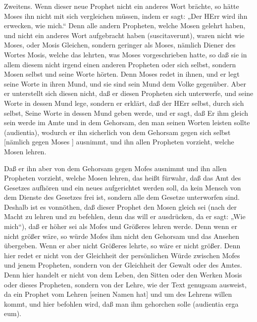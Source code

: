 Zweitens. Wenn dieser neue Prophet nicht ein anderes Wort brächte, so hätte Moses ihn nicht mit sich vergleichen müssen, indem er sagt: „Der HErr wird ihn erwecken, wie mich.“ Denn alle andern Propheten, welche Mosen gelehrt haben, und nicht ein anderes Wort aufgebracht haben (suscitaverunt), waren nicht wie Moses, oder Mosis Gleichen, sondern geringer als Moses, nämlich Diener des Wortes Mosis, welche das lehrten, was Moses vorgeschrieben hatte, so daß sie in allem diesem nicht irgend einen anderen Propheten oder sich selbst, sondern Mosen selbst und seine Worte hörten. Denn Moses redet in ihnen, und er legt seine Worte in ihren Mund, und sie sind sein Mund dem Volke gegenüber. Aber er unterstellt sich diesen nicht, daß er diesen Propheten sich unterwerfe, und seine Worte in dessen Mund lege, sondern er erklärt, daß der HErr selbst, durch sich selbst, Seine Worte in dessen Mund geben werde, und er sagt, daß Er ihm gleich sein werde im Amte und in dem Gehorsam, den man seinen Worten leisten sollte (audientia), wodurch er ihn sicherlich von dem Gehorsam gegen sich selbst [nämlich gegen Moses
] ausnimmt, und ihn allen Propheten vorzieht, welche Mosen lehren.

Daß er ihn aber von dem Gehorsam gegen Mofes ausnimmt und ihn allen Propheten vorzieht, welche Mosen lehren, das heißt fürwahr, daß das Amt des Gesetzes aufhören und ein neues aufgerichtet werden soll, da kein Mensch von dem Dienste des Gesetzes frei ist, sondern alle dem Gesetze unterworfen sind. Deshalb ist es vonnöthen, daß dieser Prophet den Mosen gleich sei (nach der Macht zu lehren und zu befehlen, denn das will er ausdrücken, da er sagt: „Wie mich“), daß er höher sei als Mofes und Größeres lehren werde. Denn wenn er nicht größer wäre, so würde Mofes ihm nicht den Gehorsam und das Ansehen übergeben. Wenn er aber nicht Größeres lehrte, so wäre er nicht größer. Denn hier redet er nicht von der Gleichheit der persönlichen Würde zwischen Mofes und jenem Propheten, sondern von der Gleichheit der Gewalt oder des Amtes. Denn hier handelt er nicht von dem Leben, den Sitten oder den Werken Mosis oder dieses Propheten, sondern von der Lehre, wie der Text genugsam ausweist, da ein Prophet vom Lehren [seinen Namen hat] und um des Lehrens willen kommt, und hier befohlen wird, daß man ihm gehorchen solle (audientia erga eum).

